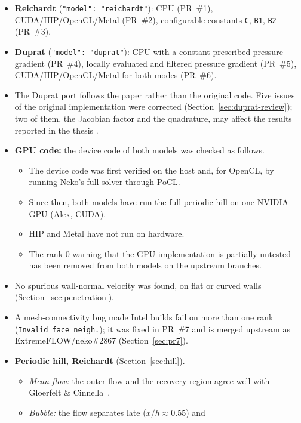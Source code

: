 \documentclass[11pt,a4paper]{article}
\newcommand{\code}[1]{\texttt{#1}}
\begin{document}
\begin{itemize}
  \item \textbf{Reichardt} (\code{"model": "reichardt"}): CPU (PR~\#1),
    CUDA/HIP/OpenCL/Metal (PR~\#2), configurable constants \code{C},
    \code{B1}, \code{B2} (PR~\#3).
  \item \textbf{Duprat} (\code{"model": "duprat"}): CPU with a constant
    prescribed pressure gradient (PR~\#4), locally evaluated and filtered
    pressure gradient (PR~\#5), CUDA/HIP/OpenCL/Metal for both modes
    (PR~\#6).
  \item The Duprat port follows the paper \cite{duprat2011} rather than the
    original code. Five issues of the original implementation were
    corrected (Section~\ref{sec:duprat-review}); two of them, the Jacobian
    factor and the quadrature, may affect the results reported in the
    thesis \cite{bole2026}.
  \item \textbf{GPU code:} the device code of both models was checked as
    follows.
    \begin{itemize}
      \item The device code was first verified on the host and, for OpenCL,
        by running Neko's full solver through PoCL.
      \item Since then, both models have run the full periodic hill on one
        NVIDIA GPU (Alex, CUDA).
      \item HIP and Metal have not run on hardware.
      \item The rank-0 warning that the GPU implementation is partially
        untested has been removed from both models on the upstream branches.
    \end{itemize}
  \item No spurious wall-normal velocity was found, on flat or curved walls
    (Section~\ref{sec:penetration}).
  \item A mesh-connectivity bug made Intel builds fail on more than one rank
    (\code{Invalid face neigh.}); it was fixed in PR~\#7 and is merged
    upstream as ExtremeFLOW/neko\#2867 (Section~\ref{sec:pr7}).
  \item \textbf{Periodic hill, Reichardt} (Section~\ref{sec:hill}).
    \begin{itemize}
      \item \emph{Mean flow:} the outer flow and the recovery region agree
        well with Gloerfelt \& Cinnella~\cite{gloerfelt2019}.
      \item \emph{Bubble:} the flow separates late ($x/h \approx 0.55$) and

\end{itemize}
\end{itemize}
\end{document}
